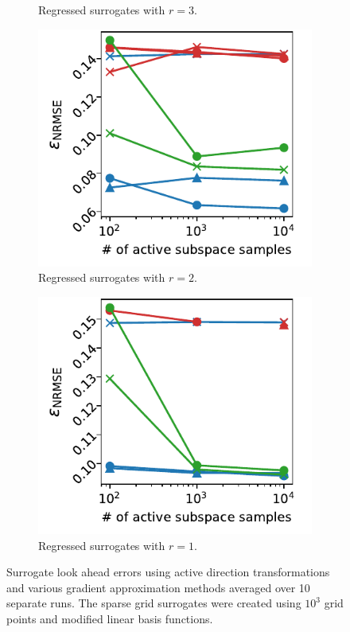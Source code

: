 \documentclass[
  a4paper,  %
  twoside,  %
  bibliography=totoc,
  headsepline,
  cleardoublepage=empty,
  parskip=half,
  draft=false
]{scrbook}
\begin{document}
\begin{mdframed}[style=style]
\begin{figure}[H]
\begin{subfigure}{.5\textwidth}
	\caption{Regressed surrogates with $r=3$.}
	\label{fig:ishigami_as_3}
\end{subfigure}\vspace{4mm}
\begin{subfigure}{.5\textwidth}
  \centering
   \includegraphics[width=\linewidth]{graphics/ishigami_as_2}
	\caption{Regressed surrogates with $r=2$.}
	\label{fig:ishigami_as_2}
\end{subfigure}
\begin{subfigure}{.5\textwidth}
  \centering
   \includegraphics[width=\linewidth]{graphics/ishigami_as_1}
	\caption{Regressed surrogates with $r=1$.}
	\label{fig:ishigami_as_1}
\end{subfigure}\vspace{4mm}
\delimit
	\caption{Surrogate look ahead errors using active direction transformations and various gradient approximation methods averaged over 10 separate runs.
	The sparse grid surrogates were created using $10^3$ grid points and modified linear basis functions.}
	\label{fig:ishigami_as}
\end{figure}
\end{mdframed}
\end{document}
